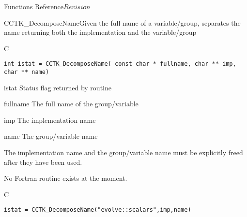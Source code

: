 \begin{cactuspart}{ Functions Reference}{}{$Revision$}
\begin{FunctionDescription}{CCTK\_DecomposeName}{Given the full name of a variable/group, separates the name returning both the implementation and the variable/group}
\label{CCTK-DecomposeName}
\begin{SynopsisSection}
\begin{Synopsis}{C}
\begin{verbatim}int istat = CCTK_DecomposeName( const char * fullname, char ** imp, char ** name)\end{verbatim}
\end{Synopsis}
\end{SynopsisSection}
\begin{ParameterSection}
\begin{Parameter}{istat}
Status flag returned by routine
\end{Parameter}
\begin{Parameter}{fullname}
The full name of the group/variable
\end{Parameter}
\begin{Parameter}{imp}
The implementation name
\end{Parameter}
\begin{Parameter}{name}
The group/variable name
\end{Parameter}
\end{ParameterSection}
\begin{Discussion}
The implementation name and the group/variable name must be
explicitly freed after they have been used.

No Fortran routine exists at the moment.
\end{Discussion}
\begin{ExampleSection}
\begin{Example}{C}
\begin{verbatim}
istat = CCTK_DecomposeName("evolve::scalars",imp,name)
\end{verbatim}
\end{Example}
\end{ExampleSection}
\end{FunctionDescription}



\end{cactuspart}
